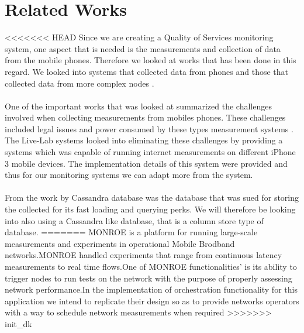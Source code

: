 \section{Related Works}
<<<<<<< HEAD
Since we are creating a Quality of Services monitoring system, one aspect that is needed is the measurements and collection of data from the mobile phones. Therefore we looked at works that has been done in this regard. We looked into systems that collected data from phones and those that collected data from more complex nodes \cite{7523537, Shepard:2011:LMW:1925019.1925023}. 
\paragraph{}
One of the important works that was looked at summarized the challenges involved when collecting measurements from mobiles phones. These challenges included legal issues and power consumed by these types measurement systems \cite{Shepard:2011:LMW:1925019.1925023}. The Live-Lab systems \cite{Shepard:2011:LMW:1925019.1925023} looked into eliminating these challenges by providing a systems which was capable of running internet measurements on different iPhone 3 mobile devices. The implementation details of this system were provided and thus for our monitoring systems we can adapt more from the system.
\paragraph{}
From the work by \cite{7523537,8255998} Cassandra database was the database that was sued for storing the collected for its fast loading and querying perks. We will therefore be looking into also using a Cassandra like database, that is a column store type of database.
=======
MONROE is a platform for running large-scale measurements and experiments in operational Mobile Brodband networks.MONROE handled experiments that range from continuous latency measurements to real time flows.One of MONROE functionalities' is its ability to trigger nodes to run tests on the network
with the purpose of properly assessing network performance.In the implementation of orchestration functionality for this application we intend to replicate their design so as to provide networks operators with a way to schedule network measurements when required %
>>>>>>> init_dk
